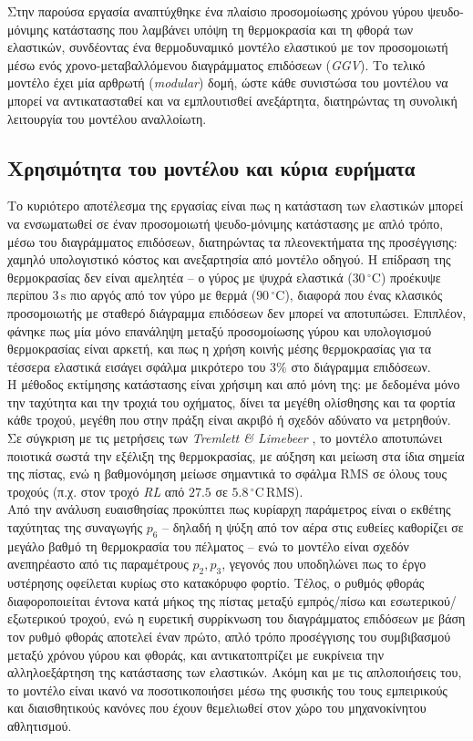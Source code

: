Στην παρούσα εργασία αναπτύχθηκε ένα πλαίσιο προσομοίωσης χρόνου γύρου ψευδο-μόνιμης κατάστασης που
λαμβάνει υπόψη τη θερμοκρασία και τη φθορά των ελαστικών, συνδέοντας ένα θερμοδυναμικό μοντέλο ελαστικού
με τον προσομοιωτή \openLap μέσω ενός χρονο-μεταβαλλόμενου διαγράμματος επιδόσεων (\textit{GGV}).
Το τελικό μοντέλο έχει μία αρθρωτή (\textit{modular}) δομή, ώστε κάθε συνιστώσα του μοντέλου να μπορεί να αντικατασταθεί και να εμπλουτισθεί ανεξάρτητα, διατηρώντας τη συνολική λειτουργία του μοντέλου αναλλοίωτη.

\subsection{Χρησιμότητα του μοντέλου και κύρια ευρήματα}

Το κυριότερο αποτέλεσμα της εργασίας είναι πως η κατάσταση των ελαστικών μπορεί να ενσωματωθεί σε έναν
προσομοιωτή ψευδο-μόνιμης κατάστασης με απλό τρόπο, μέσω του διαγράμματος επιδόσεων, διατηρώντας τα
πλεονεκτήματα της προσέγγισης: χαμηλό υπολογιστικό κόστος και ανεξαρτησία από μοντέλο οδηγού. Η επίδραση
της θερμοκρασίας δεν είναι αμελητέα -- ο γύρος με ψυχρά ελαστικά ($30\,^\circ\mathrm{C}$) προέκυψε περίπου
$3\,\mathrm{s}$ πιο αργός από τον γύρο με θερμά ($90\,^\circ\mathrm{C}$), διαφορά που ένας κλασικός
προσομοιωτής με σταθερό διάγραμμα επιδόσεων δεν μπορεί να αποτυπώσει. Επιπλέον, φάνηκε πως μία μόνο
επανάληψη μεταξύ προσομοίωσης γύρου και υπολογισμού θερμοκρασίας είναι αρκετή, και πως η χρήση κοινής
μέσης θερμοκρασίας για τα τέσσερα ελαστικά εισάγει σφάλμα μικρότερο του $3\%$ στο διάγραμμα επιδόσεων.\\[8pt]
Η μέθοδος εκτίμησης κατάστασης είναι χρήσιμη και από μόνη της: με δεδομένα μόνο την ταχύτητα και την
τροχιά του οχήματος, δίνει τα μεγέθη ολίσθησης και τα φορτία κάθε τροχού, μεγέθη που στην πράξη είναι
ακριβό ή σχεδόν αδύνατο να μετρηθούν. Σε σύγκριση με τις μετρήσεις των \textit{Tremlett \& Limebeer}
\cite{Tremlett2016}, το μοντέλο αποτυπώνει ποιοτικά σωστά την εξέλιξη της θερμοκρασίας, με αύξηση και
μείωση στα ίδια σημεία της πίστας, ενώ η βαθμονόμηση μείωσε σημαντικά το σφάλμα RMS σε όλους τους
τροχούς (π.χ. στον τροχό \textit{RL} από $27.5$ σε $5.8\,^\circ\mathrm{C}\,\mathrm{RMS}$).\\[8pt]
Από την ανάλυση ευαισθησίας προκύπτει πως κυρίαρχη παράμετρος είναι ο εκθέτης ταχύτητας της συναγωγής
$p_6$ -- δηλαδή η ψύξη από τον αέρα στις ευθείες καθορίζει σε μεγάλο βαθμό τη θερμοκρασία του πέλματος --
ενώ το μοντέλο είναι σχεδόν ανεπηρέαστο από τις παραμέτρους $p_2, p_3$, γεγονός που υποδηλώνει πως το έργο
υστέρησης οφείλεται κυρίως στο κατακόρυφο φορτίο. Τέλος, ο ρυθμός φθοράς διαφοροποιείται έντονα κατά
μήκος της πίστας μεταξύ εμπρός/πίσω και εσωτερικού/εξωτερικού τροχού, ενώ η ευρετική συρρίκνωση του
διαγράμματος επιδόσεων με βάση τον ρυθμό φθοράς αποτελεί έναν πρώτο, απλό τρόπο προσέγγισης του
συμβιβασμού μεταξύ χρόνου γύρου και φθοράς, και αντικατοπτρίζει με ευκρίνεια την αλληλοεξάρτηση της κατάστασης των ελαστικών. Ακόμη και με τις απλοποιήσεις του, το μοντέλο είναι ικανό να ποσοτικοποιήσει μέσω της φυσικής του τους εμπειρικούς και διαισθητικούς κανόνες που έχουν θεμελιωθεί στον χώρο του μηχανοκίνητου αθλητισμού.

